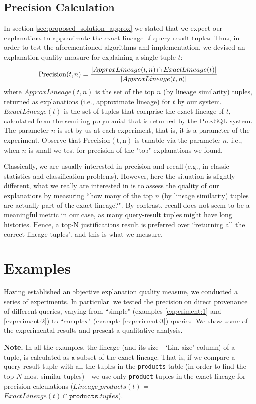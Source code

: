 \subsection{Precision Calculation} In section \ref{sec:proposed_solution_approx} we stated that we expect our explanations to approximate the exact lineage of query result tuples. 
Thus, in order to test the aforementioned algorithms and implementation, we devised an explanation quality measure for explaining a single tuple $t$: 
\begin{equation*}
    \operatorname{Precision}(t, n) = \frac{|ApproxLineage(t, n) \cap ExactLineage(t)|}{|ApproxLineage(t, n)|}\\
\end{equation*}
where $ApproxLineage(t, n)$ is the set of the top $n$ (by lineage similarity) tuples, returned as explanations (i.e., approximate lineage) for $t$ by our system. $ExactLineage(t)$ is the set of tuples that comprise the exact lineage of $t$, calculated from the semiring polynomial that is returned by the ProvSQL system. 
The parameter $n$ is set by us at each experiment, that is, it is a parameter of the experiment. 
Observe that $\operatorname{Precision(t, n)}$ is tunable via the parameter $n$, i.e., when $n$ is small we test for precision of the "top" explanations we found.\\
\par Classically, we are usually interested in precision and recall (e.g., in classic statistics and classification problems). However, here the situation is slightly different, what we really are interested in is to assess the quality of our explanations by measuring ``how many of the top $n$ (by lineage similarity) tuples are actually part of the exact lineage?". By contrast, recall does not seem to be a meaningful metric in our case, as many query-result tuples might have long histories. Hence, a top-N justifications result is preferred over ``returning all the correct lineage tuples", and this is what we measure.


\section{Examples}

Having established an objective explanation quality measure, we conducted a series of experiments. In particular, we tested the precision on direct provenance of different queries, varying from ``simple" (examples \ref{experiment:1} and \ref{experiment:2}) to ``complex" (example \ref{experiment:3}) queries. We show some of the experimental results and present a qualitative analysis.
\par\textbf{Note.} In all the examples, the lineage (and its size - `Lin. size' column) of a tuple, is calculated as a subset of the exact lineage. That is, if we compare a query result tuple with all the tuples in the \texttt{products} table (in order to find the top $N$ most similar tuples) - we use only \texttt{product} tuples in the exact lineage for precision calculations ($Lineage\_products(t)$ = $ExactLineage(t) \cap \texttt{products}.tuples$).


